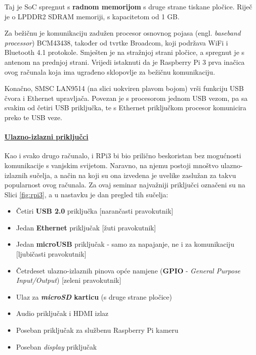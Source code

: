 \documentclass[12pt,a4paper]{article}
\begin{document}
		\par Taj je SoC spregnut s \textbf{radnom memorijom} s druge strane tiskane pločice. Riječ je o LPDDR2 SDRAM memoriji, s kapacitetom od 1 GB.

		\par Za bežičnu je komunikaciju zadužen procesor osnovnog pojasa (engl. \textit{baseband processor}) BCM43438, također od tvrtke Broadcom, koji podržava WiFi i Bluetooth 4.1 protokole. Smješten je na stražnjoj strani pločice, a spregnut je s antenom na prednjoj strani. Vrijedi istaknuti da je Raspberry Pi 3 prva inačica ovog računala koja ima ugrađeno sklopovlje za bežičnu komunikaciju.

		\par Konačno, SMSC LAN9514 (na slici uokviren plavom bojom) vrši funkciju USB čvora i Ethernet upravljača. Povezan je s procesorom jednom USB vezom, pa sa svakim od četiri USB priključka, te s Ethernet priključkom procesor komunicira preko te USB veze.

		\paragraph{\underline{Ulazno-izlazni priključci}} %
		\label{par:IO_ports}
		
		Kao i svako drugo računalo, i RPi3 bi bio prilično beskoristan bez mogućnosti komunikacije s vanjskim svijetom. Naravno, na njemu postoji mnoštvo ulazno-izlaznih sučelja, a način na koji su ona izvedena je uvelike zaslužan za takvu popularnost ovog računala. Za ovaj seminar najvažniji priključci označeni su na Slici \ref{fig:rpi3}, a u nastavku je dan pregled tih sučelja:
		\begin{itemize}
			\item Četiri \textbf{USB 2.0} priključka [narančasti pravokutnik]
			\item Jedan \textbf{Ethernet} priključak [žuti pravokutnik]
			\item Jedan \textbf{microUSB} priključak - samo za napajanje, ne i za komunikaciju [ljubičasti pravokutnik]
			\item Četrdeset ulazno-izlaznih pinova opće namjene (\textbf{GPIO} - \textit{General Purpose Input/Output}) [zeleni pravokutnik]
			\item Ulaz za \textbf{\textit{microSD} karticu} (s druge strane pločice)
			\item Audio priključak i HDMI izlaz
			\item Poseban priključak za službenu Raspberry Pi kameru
			\item Poseban \textit{display} priključak
		\end{itemize}
\end{document}
